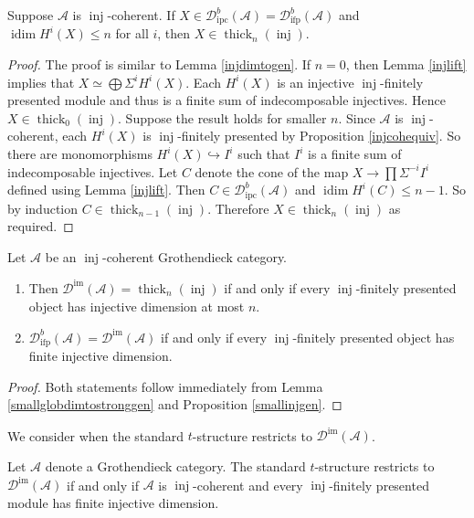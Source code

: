 \documentclass[12pt,oneside]{amsart}
\DeclareMathOperator{\thick}{thick}
\DeclareMathOperator{\idim}{idim}
\DeclareMathOperator{\inj}{inj}
\DeclareMathOperator{\immac}{im}
\DeclareMathOperator{\ipscoh}{ipc}
\DeclareMathOperator{\ifp}{ifp}
\begin{document}
\begin{lemma} \label{smallglobdimtostronggen}
Suppose $\mathcal{A}$ is $\inj$-coherent. If $X \in \mathcal{D}^b_{\ipscoh}(\mathcal{A}) = \mathcal{D}^b_{\ifp}(\mathcal{A})$ and $\idim H^i(X) \leq n$ for all $i$, then $X \in \thick_n(\inj)$.
\end{lemma}

\begin{proof}
The proof is similar to Lemma \ref{injdimtogen}. If $n = 0$, then Lemma \ref{injlift} implies that $X \simeq \bigoplus \Sigma^i H^i(X)$. Each $H^i(X)$ is an injective $\inj$-finitely presented module and thus is a finite sum of indecomposable injectives. Hence $X \in \thick_0(\inj)$. Suppose the result holds for smaller $n$. Since $\mathcal{A}$ is $\inj$-coherent, each $H^i(X)$ is $\inj$-finitely presented by Proposition \ref{injcohequiv}. So there are monomorphisms $H^i(X) \hookrightarrow I^i$ such that $I^i$ is a finite sum of indecomposable injectives. Let $C$ denote the cone of the map $X \to \prod \Sigma^{-i} I^i$ defined using Lemma \ref{injlift}. Then $C \in \mathcal{D}^b_{\ipscoh}(\mathcal{A})$ and $\idim H^i(C) \leq n-1$. So by induction $C \in \thick_{n-1}(\inj)$. Therefore $X \in \thick_n(\inj)$ as required. 
\end{proof}

\begin{theorem} \label{smallglobdim}
Let $\mathcal{A}$ be an $\inj$-coherent Grothendieck category. 
\begin{enumerate}
\item Then $\mathcal{D}^{\immac}(\mathcal{A}) = \thick_n(\inj)$ if and only if every $\inj$-finitely presented object has injective dimension at most $n$.

\item $\mathcal{D}_{\ifp}^b(\mathcal{A}) = \mathcal{D}^{\immac}(\mathcal{A})$ if and only if every $\inj$-finitely presented object has finite injective dimension.
\end{enumerate}
\end{theorem}

\begin{proof}
Both statements follow immediately from Lemma \ref{smallglobdimtostronggen} and Proposition \ref{smallinjgen}.
\end{proof}

 We consider when the standard $t$-structure restricts to $\mathcal{D}^{\immac}(\mathcal{A})$.

\begin{theorem} \label{t-structregular} Let $\mathcal{A}$ denote a Grothendieck category. The standard $t$-structure restricts to $\mathcal{D}^{\immac}(\mathcal{A})$ if and only if $\mathcal{A}$ is $\inj$-coherent and every $\inj$-finitely presented module has finite injective dimension. 
\end{theorem}
\end{document}
